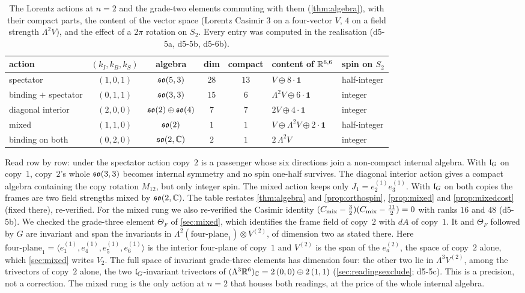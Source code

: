 \begin{table}[t]
\centering
\small
\begin{tabular}{@{}lccccll@{}}
\toprule
action & $(k_I,k_B,k_S)$ & algebra & dim & compact & content of $\mathbb{R}^{6,6}$ & spin on $S_2$\\
\midrule
spectator & $(1,0,1)$ & $\mathfrak{so}(5,3)$ & $28$ & $13$ & $V\oplus8\cdot\mathbf1$ & half-integer\\
binding $+$ spectator & $(0,1,1)$ & $\mathfrak{so}(3,3)$ & $15$ & $6$ & $\Lambda^2V\oplus6\cdot\mathbf1$ & integer\\
diagonal interior & $(2,0,0)$ & $\mathfrak{so}(2)\oplus\mathfrak{so}(4)$ & $7$ & $7$ & $2V\oplus4\cdot\mathbf1$ & integer\\
mixed & $(1,1,0)$ & $\mathfrak{so}(2)$ & $1$ & $1$ & $V\oplus\Lambda^2V\oplus2\cdot\mathbf1$ & half-integer\\
binding on both & $(0,2,0)$ & $\mathfrak{so}(2,\mathbb{C})$ & $2$ & $1$ & $2\,\Lambda^2V$ & integer\\
\bottomrule
\end{tabular}
\caption{The Lorentz actions at $n=2$ and the grade-two elements commuting with them (\cref{thm:algebra}), with their compact parts,
the content of the vector space (Lorentz Casimir $3$ on a four-vector $V$, $4$ on a field strength $\Lambda^2V$), and the effect of a $2\pi$
rotation on $S_2$. Every entry was computed in the realisation (d5-5a, d5-5b, d5-6b).}
\label{d5:tab:actions}
\end{table}

Read row by row: under the spectator action copy~$2$ is a passenger whose six directions join a non-compact internal algebra. With
$\mathfrak l_G$ on copy~$1$, copy~$2$'s whole $\mathfrak{so}(3,3)$ becomes internal symmetry and no spin one-half survives. The diagonal interior action gives a
compact algebra containing the copy rotation $M_{12}$, but only integer spin. The mixed action keeps only $J_1=e^{(1)}_2e^{(1)}_3$. With $\mathfrak l_G$ on both
copies the frames are two field strengths mixed by $\mathfrak{so}(2,\mathbb{C})$. The table restates \cref{thm:algebra} and \cref{prop:orthospin}, \cref{prop:mixed} and \cref{prop:mixedcost} (fixed there), re-verified. For the mixed rung we also re-verified the Casimir identity
$(C_{\rm mix}-\tfrac32)(C_{\rm mix}-\tfrac{11}2)=0$ with ranks $16$ and $48$ (d5-5b). We checked the grade-three element $\Theta_F$ of \cref{sec:mixed}, which identifies the frame field of copy~$2$ with $dA$ of copy~$1$. It and $\Theta_F$ followed by $G$ are invariant and span the
invariants in $\Lambda^2(\text{four-plane}_1)\otimes V^{(2)}$, of dimension two as stated there. Here $\text{four-plane}_1=\langle e^{(1)}_1,e^{(1)}_4,e^{(1)}_5,e^{(1)}_6\rangle$ is the interior four-plane of copy~$1$ and $V^{(2)}$ is the span of the $e^{(2)}_a$, the space of copy~$2$ alone, which \cref{sec:mixed} writes $V_2$. The full space of invariant grade-three elements has
dimension four: the other two lie in $\Lambda^3V^{(2)}$, among the trivectors of copy~$2$ alone, the two $\mathfrak l_G$-invariant trivectors of
$(\Lambda^3\mathbb{R}^6)_{\mathbb{C}}=2\,(0,0)\oplus2\,(1,1)$ (\cref{sec:readingsexclude}; d5-5c). This is a precision, not a correction. The mixed rung is the only
action at $n=2$ that houses both readings, at the price of the whole internal algebra.

